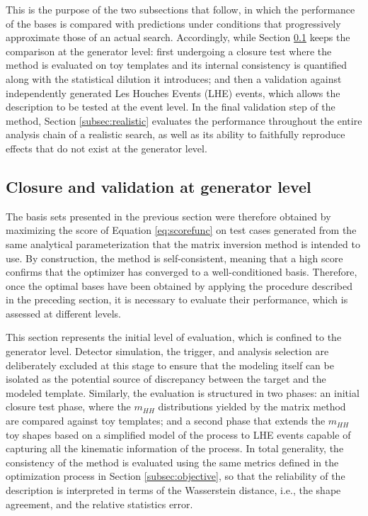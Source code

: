 This is the purpose of the two subsections that follow, in which the performance of the bases is compared with predictions under conditions that progressively approximate those of an actual search. Accordingly, while Section \ref{subsec:closure} keeps the comparison at the generator level: first undergoing a closure test where the method is evaluated on toy templates and its internal consistency is quantified along with the statistical dilution it introduces; and then a validation against independently generated Les Houches Events (LHE) events, which allows the description to be tested at the event level. In the final validation step of the method, Section \ref{subsec:realistic} evaluates the performance throughout the entire analysis chain of a realistic search, as well as its ability to faithfully reproduce effects that do not exist at the generator level.

\subsection{Closure and validation at generator level}
\label{subsec:closure}
%
The basis sets presented in the previous section were therefore obtained by maximizing the score of Equation \ref{eq:scorefunc} on test cases generated from the same analytical parameterization that the matrix inversion method is intended to use. By construction, the method is self-consistent, meaning that a high score confirms that the optimizer has converged to a well-conditioned basis. Therefore, once the optimal bases have been obtained by applying the procedure described in the preceding section, it is necessary to evaluate their performance, which is assessed at different levels.

This section represents the initial level of evaluation, which is confined to the generator level. Detector simulation, the trigger, and analysis selection are deliberately excluded at this stage to ensure that the modeling itself can be isolated as the potential source of discrepancy between the target and the modeled template. Similarly, the evaluation is structured in two phases: an initial closure test phase, where the $m_{HH}$ distributions yielded by the matrix method are compared against toy templates; and a second phase that extends the $m_{HH}$ toy shapes based on a simplified model of the process to LHE events capable of capturing all the kinematic information of the process. In total generality, the consistency of the method is evaluated using the same metrics defined in the optimization process in Section \ref{subsec:objective}, so that the reliability of the description is interpreted in terms of the Wasserstein distance, i.e., the shape agreement, and the relative statistics error.\medskip

